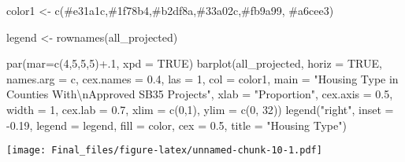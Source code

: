 \documentclass[
]{article}
\newenvironment{Shaded}{\begin{snugshade}}{\end{snugshade}}
\newcommand{\AttributeTok}[1]{\textcolor[rgb]{0.77,0.63,0.00}{#1}}
\newcommand{\ConstantTok}[1]{\textcolor[rgb]{0.00,0.00,0.00}{#1}}
\newcommand{\DecValTok}[1]{\textcolor[rgb]{0.00,0.00,0.81}{#1}}
\newcommand{\FloatTok}[1]{\textcolor[rgb]{0.00,0.00,0.81}{#1}}
\newcommand{\FunctionTok}[1]{\textcolor[rgb]{0.00,0.00,0.00}{#1}}
\newcommand{\NormalTok}[1]{#1}
\newcommand{\OtherTok}[1]{\textcolor[rgb]{0.56,0.35,0.01}{#1}}
\newcommand{\SpecialCharTok}[1]{\textcolor[rgb]{0.00,0.00,0.00}{#1}}
\newcommand{\StringTok}[1]{\textcolor[rgb]{0.31,0.60,0.02}{#1}}
\begin{document}
\begin{Shaded}
\begin{Highlighting}[]
\NormalTok{color1 }\OtherTok{\textless{}{-}} \FunctionTok{c}\NormalTok{(}\StringTok{\textquotesingle{}\#e31a1c\textquotesingle{}}\NormalTok{,}\StringTok{\textquotesingle{}\#1f78b4\textquotesingle{}}\NormalTok{,}\StringTok{\textquotesingle{}\#b2df8a\textquotesingle{}}\NormalTok{,}\StringTok{\textquotesingle{}\#33a02c\textquotesingle{}}\NormalTok{,}\StringTok{\textquotesingle{}\#fb9a99\textquotesingle{}}\NormalTok{, }\StringTok{\textquotesingle{}\#a6cee3\textquotesingle{}}\NormalTok{)}

\NormalTok{legend }\OtherTok{\textless{}{-}} \FunctionTok{rownames}\NormalTok{(all\_projected)}

\FunctionTok{par}\NormalTok{(}\AttributeTok{mar=}\FunctionTok{c}\NormalTok{(}\DecValTok{4}\NormalTok{,}\DecValTok{5}\NormalTok{,}\DecValTok{5}\NormalTok{,}\DecValTok{5}\NormalTok{)}\SpecialCharTok{+}\NormalTok{.}\DecValTok{1}\NormalTok{, }\AttributeTok{xpd =} \ConstantTok{TRUE}\NormalTok{)}
\FunctionTok{barplot}\NormalTok{(all\_projected, }\AttributeTok{horiz =} \ConstantTok{TRUE}\NormalTok{, }\AttributeTok{names.arg =}\NormalTok{ c, }\AttributeTok{cex.names =} \FloatTok{0.4}\NormalTok{, }\AttributeTok{las =} \DecValTok{1}\NormalTok{, }\AttributeTok{col =}\NormalTok{ color1, }\AttributeTok{main =} \StringTok{"Housing Type in Counties With}\SpecialCharTok{\textbackslash{}n}\StringTok{Approved SB35 Projects"}\NormalTok{, }\AttributeTok{xlab =} \StringTok{"Proportion"}\NormalTok{, }\AttributeTok{cex.axis =} \FloatTok{0.5}\NormalTok{, }\AttributeTok{width =} \DecValTok{1}\NormalTok{, }\AttributeTok{cex.lab =} \FloatTok{0.7}\NormalTok{, }\AttributeTok{xlim =} \FunctionTok{c}\NormalTok{(}\DecValTok{0}\NormalTok{,}\DecValTok{1}\NormalTok{), }\AttributeTok{ylim =} \FunctionTok{c}\NormalTok{(}\DecValTok{0}\NormalTok{, }\DecValTok{32}\NormalTok{))}
\FunctionTok{legend}\NormalTok{(}\StringTok{"right"}\NormalTok{, }\AttributeTok{inset =} \SpecialCharTok{{-}}\FloatTok{0.19}\NormalTok{, }\AttributeTok{legend =}\NormalTok{ legend, }\AttributeTok{fill =}\NormalTok{ color, }\AttributeTok{cex =} \FloatTok{0.5}\NormalTok{, }\AttributeTok{title =} \StringTok{"Housing Type"}\NormalTok{)}
\end{Highlighting}
\end{Shaded}

\texttt{[image: Final\_files/figure-latex/unnamed-chunk-10-1.pdf]}
\end{document}
